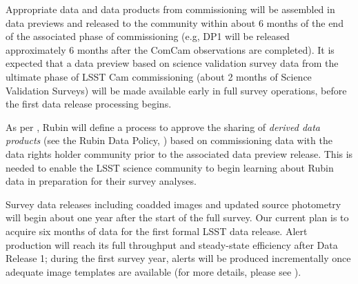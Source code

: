 Appropriate data and data products from commissioning will be assembled in data previews  and released to the community within about 6 months of the end of the associated phase of commissioning (e.g, DP1 will be released approximately 6 months after the ComCam observations are completed).
It is expected that a data preview based on science validation survey data from the ultimate phase of LSST Cam commissioning (about 2 months of Science Validation Surveys) will be made available early in full survey operations, before the first data release processing begins.

As per , Rubin will define a process to approve the sharing of {\it derived data products} (see the Rubin Data Policy, ) based on commissioning data with the data rights holder community prior to the associated data preview release.
This is needed to enable the LSST science community to begin learning about Rubin data in preparation for their survey analyses.

Survey data releases including coadded images and updated source photometry will begin about one year after the start of the full survey.
Our current plan is to acquire six months of data for the first formal LSST data release.
Alert production will reach its full throughput and steady-state efficiency after Data Release 1; during the first survey year, alerts will be produced incrementally once adequate image templates are available (for more details, please see ).
